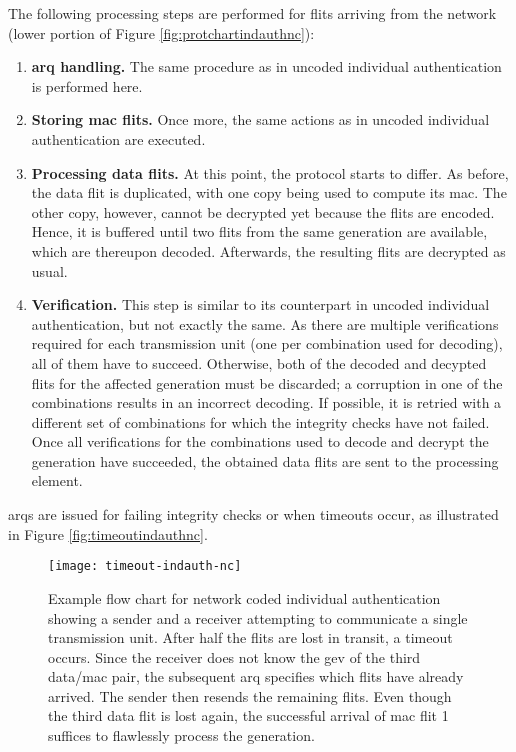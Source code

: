 The following processing steps are performed for flits arriving from the network (lower portion of Figure \ref{fig:protchartindauthnc}):
\begin{enumerate}
    \item \textbf{\Gls{arq} handling.} The same procedure as in uncoded individual authentication is performed here.
    \item \textbf{Storing \gls{mac} flits.} Once more, the same actions as in uncoded individual authentication are executed.
    \item \textbf{Processing data flits.} At this point, the protocol starts to differ. As before, the data flit is duplicated, with one copy being
        used to compute its \gls{mac}. The other copy, however, cannot be decrypted yet because the flits are encoded. Hence, it is buffered until two
        flits from the same generation are available, which are thereupon decoded. Afterwards, the resulting flits are decrypted as usual.
    \item \textbf{Verification.} This step is similar to its counterpart in uncoded individual authentication, but not exactly the same. As there are
        multiple verifications required for each transmission unit (one per combination used for decoding), all of them have to succeed. Otherwise, both of the decoded
        and decypted flits for the affected generation must be discarded; a corruption in one of the combinations results in an incorrect decoding. If
        possible, it is retried with a different set of combinations for which the integrity checks have not failed. Once all verifications for the
        combinations used to decode and decrypt the generation have succeeded, the obtained data flits are sent to the processing element.
\end{enumerate}
\vspace{0.5\baselineskip}

\Glspl{arq} are issued for failing integrity checks or when timeouts occur, as illustrated in Figure \vref{fig:timeoutindauthnc}.

\begin{figure}
    \centering
    \texttt{[image: timeout-indauth-nc]}
    \caption[Example flow chart for network coded ind. auth. with many losses]{Example flow chart for network coded individual authentication showing
    a sender and a receiver attempting to communicate a single transmission unit. After half the flits are lost in transit, a timeout occurs. Since
    the receiver does not know the \gls{gev} of the third data/\gls{mac} pair, the subsequent \gls{arq} specifies which flits have already arrived.
    The sender then resends the remaining flits. Even though the third data flit is lost again, the successful arrival of \gls{mac} flit 1 suffices to
    flawlessly process the generation.}
    \label{fig:timeoutindauthnc}
\end{figure}

